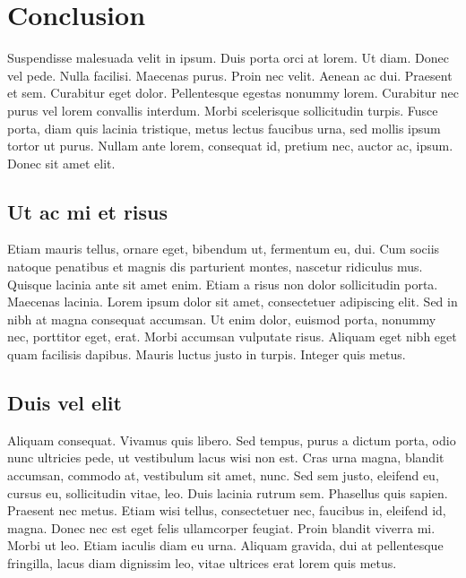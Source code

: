 \chapter{Conclusion}


Suspendisse malesuada velit in ipsum. Duis porta orci at lorem. Ut
diam. Donec vel pede. Nulla facilisi. Maecenas purus. Proin nec
velit. Aenean ac dui. Praesent et sem. Curabitur eget dolor.
Pellentesque egestas nonummy lorem. Curabitur nec purus vel lorem
convallis interdum. Morbi scelerisque sollicitudin turpis. Fusce
porta, diam quis lacinia tristique, metus lectus faucibus urna,
sed mollis ipsum tortor ut purus. Nullam ante lorem, consequat id,
pretium nec, auctor ac, ipsum. Donec sit amet elit.

\section{Ut ac mi et risus} Etiam mauris
tellus, ornare eget, bibendum ut, fermentum eu, dui. Cum sociis
natoque penatibus et magnis dis parturient montes, nascetur
ridiculus mus. Quisque lacinia ante sit amet enim. Etiam a risus
non dolor sollicitudin porta. Maecenas lacinia. Lorem ipsum dolor
sit amet, consectetuer adipiscing elit. Sed in nibh at magna
consequat accumsan. Ut enim dolor, euismod porta, nonummy nec,
porttitor eget, erat. Morbi accumsan vulputate risus. Aliquam eget
nibh eget quam facilisis dapibus. Mauris luctus justo in
\cite{Bell} turpis. Integer quis metus.

\section{Duis vel elit} Aliquam consequat. Vivamus quis libero. Sed
tempus, purus a dictum porta, odio nunc ultricies pede, ut
vestibulum lacus wisi non est. Cras urna magna, blandit accumsan,
commodo at, vestibulum sit amet, nunc. Sed sem justo, eleifend eu,
cursus eu, sollicitudin vitae, leo. Duis lacinia rutrum sem.
Phasellus quis sapien. Praesent nec metus. Etiam wisi tellus,
consectetuer nec, faucibus in, eleifend id, magna. Donec nec est
eget felis ullamcorper feugiat. Proin blandit viverra mi. Morbi ut
leo. Etiam iaculis diam eu urna. Aliquam gravida, dui at
pellentesque fringilla, lacus diam dignissim leo, vitae ultrices
erat lorem quis metus.
